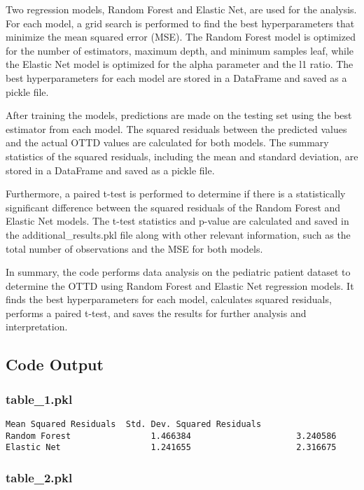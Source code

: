 \documentclass[11pt]{article}
\begin{document}
Two regression models, Random Forest and Elastic Net, are used for the analysis. For each model, a grid search is performed to find the best hyperparameters that minimize the mean squared error (MSE). The Random Forest model is optimized for the number of estimators, maximum depth, and minimum samples leaf, while the Elastic Net model is optimized for the alpha parameter and the l1 ratio. The best hyperparameters for each model are stored in a DataFrame and saved as a pickle file.

After training the models, predictions are made on the testing set using the best estimator from each model. The squared residuals between the predicted values and the actual OTTD values are calculated for both models. The summary statistics of the squared residuals, including the mean and standard deviation, are stored in a DataFrame and saved as a pickle file.

Furthermore, a paired t-test is performed to determine if there is a statistically significant difference between the squared residuals of the Random Forest and Elastic Net models. The t-test statistics and p-value are calculated and saved in the additional\_results.pkl file along with other relevant information, such as the total number of observations and the MSE for both models.

In summary, the code performs data analysis on the pediatric patient dataset to determine the OTTD using Random Forest and Elastic Net regression models. It finds the best hyperparameters for each model, calculates squared residuals, performs a paired t-test, and saves the results for further analysis and interpretation.

\subsection{Code Output}

\subsubsection*{table\_1.pkl}

\begin{Verbatim}[tabsize=4]
               Mean Squared Residuals  Std. Dev. Squared Residuals
Random Forest                1.466384                     3.240586
Elastic Net                  1.241655                     2.316675
\end{Verbatim}

\subsubsection*{table\_2.pkl}
\end{document}
